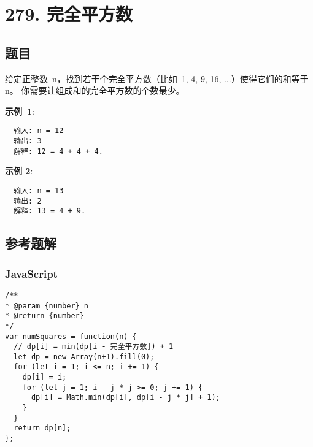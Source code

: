\newpage
\section{279. 完全平方数}
\label{leetcode:279}

\subsection{题目}

给定正整数 n，找到若干个完全平方数（比如 1, 4, 9, 16, ...）使得它们的和等于 n。
你需要让组成和的完全平方数的个数最少。

\textbf{示例 1}:

\begin{verbatim}
  输入: n = 12
  输出: 3
  解释: 12 = 4 + 4 + 4.
\end{verbatim}

\textbf{示例 2}:

\begin{verbatim}
  输入: n = 13
  输出: 2
  解释: 13 = 4 + 9.
\end{verbatim}

\subsection{参考题解}

\subsubsection{JavaScript}

\begin{verbatim}
/**
* @param {number} n
* @return {number}
*/
var numSquares = function(n) {
  // dp[i] = min(dp[i - 完全平方数]) + 1
  let dp = new Array(n+1).fill(0);
  for (let i = 1; i <= n; i += 1) {
    dp[i] = i;
    for (let j = 1; i - j * j >= 0; j += 1) {
      dp[i] = Math.min(dp[i], dp[i - j * j] + 1);
    }
  }
  return dp[n];
};
\end{verbatim}
